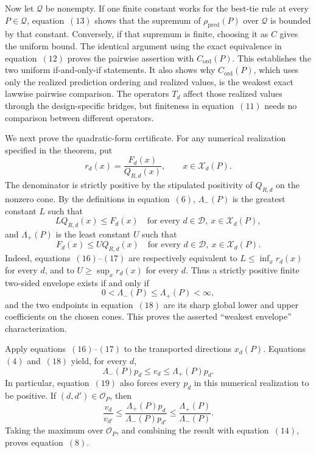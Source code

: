 Now let \(\mathcal Q\) be nonempty.  If one finite constant works for the best-tie rule at every \(P\in\mathcal Q\), equation~\((13)\) shows that the supremum of \(\rho_{\mathrm{pred}}(P)\) over \(\mathcal Q\) is bounded by that constant.  Conversely, if that supremum is finite, choosing it as \(C\) gives the uniform bound.  The identical argument using the exact equivalence in equation~\((12)\) proves the pairwise assertion with \(C_{\mathrm{ord}}(P)\).  This establishes the two uniform if-and-only-if statements.  It also shows why \(C_{\mathrm{ord}}(P)\), which uses only the realized prediction ordering and realized values, is the weakest exact lawwise pairwise comparison.  The operators \(T_d\) affect those realized values through the design-specific bridges, but finiteness in equation~\((11)\) needs no comparison between different operators.

We next prove the quadratic-form certificate.  For any numerical realization specified in the theorem, put
\[
 r_d(x)=\frac{F_d(x)}{Q_{R,d}(x)},
 \qquad x\in\mathcal X_d(P).                              \tag{15}
\]
The denominator is strictly positive by the stipulated positivity of \(Q_{R,d}\) on the nonzero cone.  By the definitions in equation~\((6)\), \(\Lambda_-(P)\) is the greatest constant \(L\) such that
\[
 LQ_{R,d}(x)\le F_d(x)
 \quad\text{for every }d\in\mathcal D,
 \ x\in\mathcal X_d(P),                                  \tag{16}
\]
and \(\Lambda_+(P)\) is the least constant \(U\) such that
\[
 F_d(x)\le UQ_{R,d}(x)
 \quad\text{for every }d\in\mathcal D,
 \ x\in\mathcal X_d(P).                                  \tag{17}
\]
Indeed, equations~\((16)\)--\((17)\) are respectively equivalent to \(L\le\inf_xr_d(x)\) for every \(d\), and to \(U\ge\sup_xr_d(x)\) for every \(d\).  Thus a strictly positive finite two-sided envelope exists if and only if
\[
 0<\Lambda_-(P)\le\Lambda_+(P)<\infty,                   \tag{18}
\]
and the two endpoints in equation~\((18)\) are its sharp global lower and upper coefficients on the chosen cones.  This proves the asserted ``weakest envelope'' characterization.

Apply equations~\((16)\)--\((17)\) to the transported directions \(x_d(P)\).  Equations~\((4)\) and~\((18)\) yield, for every \(d\),
\[
 \Lambda_-(P)p_d\le v_d\le\Lambda_+(P)p_d.               \tag{19}
\]
In particular, equation~\((19)\) also forces every \(p_d\) in this numerical realization to be positive.  If \((d,d')\in\mathcal O_P\), then
\[
 \frac{v_d}{v_{d'}}
 \le
 \frac{\Lambda_+(P)p_d}{\Lambda_-(P)p_{d'}}
 \le \frac{\Lambda_+(P)}{\Lambda_-(P)}.                  \tag{20}
\]
Taking the maximum over \(\mathcal O_P\), and combining the result with equation~\((14)\), proves equation~\((8)\).

